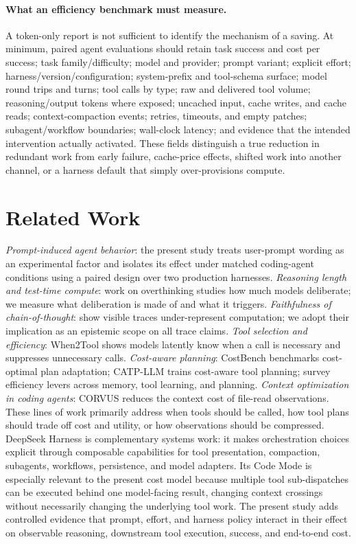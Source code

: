\documentclass[11pt]{article}
\newcommand{\citet}[1]{\cite{#1}}
\newcommand{\citep}[1]{\cite{#1}}
\begin{document}
\paragraph{What an efficiency benchmark must measure.} A token-only report is
not sufficient to identify the mechanism of a saving. At minimum, paired
agent evaluations should retain task success and cost per success; task
family/difficulty; model and provider; prompt variant; explicit effort;
harness/version/configuration; system-prefix and tool-schema surface; model
round trips and turns; tool calls by type; raw and delivered tool volume;
reasoning/output tokens where exposed; uncached input, cache writes, and cache
reads; context-compaction events; retries, timeouts, and empty patches;
subagent/workflow boundaries; wall-clock latency; and evidence that the
intended intervention actually activated. These fields distinguish a true
reduction in redundant work from early failure, cache-price effects, shifted
work into another channel, or a harness default that simply over-provisions
compute.

\section{Related Work}

\emph{Prompt-induced agent behavior}: the present study treats user-prompt
wording as an experimental factor and isolates its effect under matched
coding-agent conditions using a paired design over two production harnesses. \emph{Reasoning length and test-time compute}: work on
overthinking studies how much models deliberate; we measure what
deliberation is made of and what it triggers. \emph{Faithfulness of
chain-of-thought}: \citet{baherwani2026} show visible traces
under-represent computation; we adopt their implication as an epistemic
scope on all trace claims. \emph{Tool selection and efficiency}:
When2Tool \citep{sun2026when2tool} shows models latently know when a call
is necessary and suppresses unnecessary calls. \emph{Cost-aware
planning}: CostBench \citep{liu2025costbench} benchmarks cost-optimal
plan adaptation; CATP-LLM \citep{wu2024catp} trains cost-aware tool
planning; \citet{yang2026efficient} survey efficiency levers across
memory, tool learning, and planning. \emph{Context optimization in coding
agents}: CORVUS \citep{zheng2026corvus} reduces the context cost of
file-read observations. These lines of work primarily address when tools should be called, how tool
plans should trade off cost and utility, or how observations should be
compressed. DeepSeek Harness \citep{deepseekharness} is complementary
systems work: it makes orchestration choices explicit through composable
capabilities for tool presentation, compaction, subagents, workflows,
persistence, and model adapters. Its Code Mode is especially relevant to the
present cost model because multiple tool sub-dispatches can be executed behind
one model-facing result, changing context crossings without necessarily
changing the underlying tool work. The present study adds controlled evidence
that prompt, effort, and harness policy interact in their effect on observable
reasoning, downstream tool execution, success, and end-to-end cost.
\end{document}
